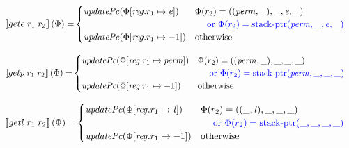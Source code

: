 \documentclass[a4paper]{article}
\newcommand{\sem}[1]{\left\llbracket #1 \right\rrbracket}
\newcommand{\tor}{\text{ or }}
\newcommand{\totherwise}{\text{otherwise }}
\newcommand{\sourcecolor}[1]{\color{blue}}
\newcommand{\src}[1]{{\sourcecolor{} #1}}
\newcommand{\targetcolor}[1]{\color{black}}
\newcommand{\trg}[1]{{\targetcolor{} #1}}
\newcommand{\zinstr}[1]{#1}
\newcommand{\twoinstr}[3]{
  \ifthenelse{\equal{#2#3}{}}
  {\zinstr{#1}}
  {\zinstr{#1} \; #2 \; #3}
}
\newcommand{\tgete}[2]{\twoinstr{\trg{gete}}{#1}{#2}}
\newcommand{\tgetp}[2]{\twoinstr{\trg{getp}}{#1}{#2}}
\newcommand{\tgetlin}[2]{\twoinstr{\trg{getl}}{#1}{#2}}
\newcommand{\update}[2]{[#1 \mapsto #2]}
\newcommand{\updReg}[2]{\update{\reg.#1}{#2}}
\newcommand{\perm}{\var{perm}}
\newcommand{\lin}{\var{l}}
\newcommand{\stkptr}[1]{\mathrm{stack\text{-}ptr}(#1)}
\newcommand{\var}[1]{\mathit{#1}}
\newcommand{\reg}{\var{reg}}
\newcommand{\eaddr}{\var{e}}
\newcommand{\plainfun}[2]{
  \ifthenelse{\equal{#2}{}}
  {\mathit{#1}}
  {\mathit{#1}(#2)}
}
\newcommand{\updPcAddr}[1]{\plainfun{updatePc}{#1}}
\begin{document}
\begin{align*}
  \sem{\tgete{r_1}{r_2}}(\Phi) = & 
                                   \begin{cases}
                                     \updPcAddr{\Phi\updReg{r_1}{\eaddr}} & 
                                     \arraycolsep=0pt
                                     \begin{array}[t]{l}
                                       \Phi(r_2) = ((\perm,\_),\_,\eaddr,\_) \\
                                       \quad \src{\tor \Phi(r_2) = \stkptr{\perm,\_,\eaddr,\_} } \\
                                     \end{array} \\
                                     \updPcAddr{\Phi\updReg{r_1}{-1}} & \totherwise
                                   \end{cases}
\end{align*}

\begin{align*}
  \sem{\tgetp{r_1}{r_2}}(\Phi) = & 
                                   \begin{cases}
                                     \updPcAddr{\Phi\updReg{r_1}{\perm}} & 
                                     \arraycolsep=0pt
                                     \begin{array}[t]{l}
                                       \Phi(r_2) = ((\perm,\_),\_,\_,\_) \\
                                       \quad \src{\tor \Phi(r_2) = \stkptr{\perm,\_,\_,\_} } \\
                                     \end{array} \\
                                     \updPcAddr{\Phi\updReg{r_1}{-1}} & \totherwise
                                   \end{cases}
\end{align*}

\begin{align*}
  \sem{\tgetlin{r_1}{r_2}}(\Phi) = & 
                                   \begin{cases}
                                     \updPcAddr{\Phi\updReg{r_1}{\lin}} & 
                                     \arraycolsep=0pt
                                     \begin{array}[t]{l}
                                       \Phi(r_2) = ((\_,\lin),\_,\_,\_) \\
                                       \quad \src{\tor \Phi(r_2) = \stkptr{\_,\_,\_,\_} } \\
                                     \end{array} \\
                                     \updPcAddr{\Phi\updReg{r_1}{-1}} & \totherwise
                                   \end{cases}
\end{align*}
\end{document}
